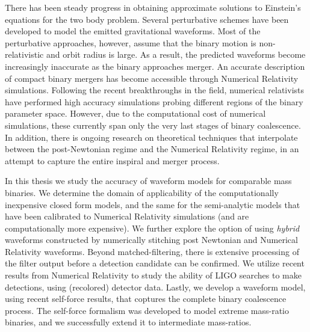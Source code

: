 There has been steady progress in obtaining approximate solutions to Einstein's
equations for the two body problem. Several perturbative schemes have been 
developed to model the emitted gravitational waveforms. Most of
the perturbative approaches, however, assume that the binary motion is 
non-relativistic and orbit radius is large. As a result, the predicted 
waveforms become increasingly inaccurate as the binary approaches merger. 
An accurate description of compact binary mergers has become accessible
through Numerical Relativity simulations. Following the recent breakthroughs
in the field, numerical relativists have performed high accuracy simulations
probing different regions of the binary parameter space. 
However, due to the computational cost of numerical simulations, these currently
span only the very last stages of binary coalescence. In addition, there is ongoing
research on theoretical techniques that interpolate between the 
post-Newtonian regime and the Numerical Relativity regime, in an attempt to 
capture the entire inspiral and merger process.

In this thesis we study the accuracy of waveform models for comparable mass binaries.
We determine the domain of applicability of the computationally inexpensive closed 
form models, and the same for the semi-analytic models that have been calibrated
to Numerical Relativity simulations (and are computationally more expensive).
We further explore the option of 
using {\it hybrid} waveforms constructed by numerically stitching post 
Newtonian and Numerical Relativity waveforms. Beyond matched-filtering, there 
is extensive processing of the filter output before a detection candidate can
be confirmed. We utilize recent results from Numerical Relativity to study
the ability of LIGO searches to make detections, using (recolored) detector data.
Lastly, we develop a waveform model, using recent self-force results, that 
coptures the complete binary coalescence process. The self-force formalism was
developed to model extreme mass-ratio binaries, and we successfully extend it 
to intermediate mass-ratios.
